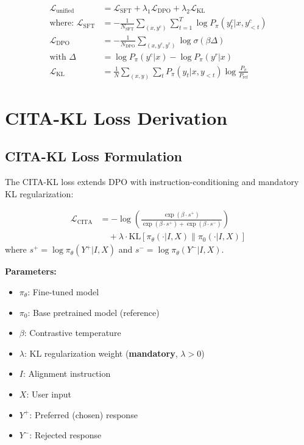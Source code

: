 \begin{align}
\mathcal{L}_{\text{unified}} &= \mathcal{L}_{\text{SFT}} + \lambda_1 \mathcal{L}_{\text{DPO}} + \lambda_2 \mathcal{L}_{\text{KL}} \nonumber \\[3pt]
\text{where: } \mathcal{L}_{\text{SFT}} &= -\frac{1}{N_{\text{SFT}}} \sum_{(x, y^{c})} \sum_{t=1}^{T} \log P_\pi(y_t^{c}|x, y_{<t}^{c}) \nonumber \\[3pt]
\mathcal{L}_{\text{DPO}} &= -\frac{1}{N_{\text{DPO}}} \sum_{(x, y^{c}, y^{r})} \log \sigma(\beta \Delta) \nonumber \\
\text{with } \Delta &= \log P_\pi(y^{c}|x) - \log P_\pi(y^{r}|x) \nonumber \\[3pt]
\mathcal{L}_{\text{KL}} &= \frac{1}{N} \sum_{(x,y)} \sum_{t} P_\pi(y_t|x, y_{<t}) \log \frac{P_\pi}{P_{\text{ref}}}
\label{eq:full_expanded}
\end{align}

\section{CITA-KL Loss Derivation}
\label{sec:appendix_cita_kl}

\subsection{CITA-KL Loss Formulation}

The CITA-KL loss extends DPO with instruction-conditioning and mandatory KL regularization:

\begin{align}
\mathcal{L}_{\text{CITA}} &= -\log\left(\frac{\exp(\beta \cdot s^+)}{\exp(\beta \cdot s^+) + \exp(\beta \cdot s^-)}\right) \nonumber \\
&\quad + \lambda \cdot \text{KL}[\pi_\theta(\cdot | I, X) \| \pi_0(\cdot | I, X)]
\label{eq:cita_kl_full}
\end{align}
where $s^+ = \log \pi_\theta(Y^+ | I, X)$ and $s^- = \log \pi_\theta(Y^- | I, X)$.

\textbf{Parameters:}
\begin{itemize}[leftmargin=*,itemsep=1pt]
    \item $\pi_\theta$: Fine-tuned model
    \item $\pi_0$: Base pretrained model (reference)
    \item $\beta$: Contrastive temperature
    \item $\lambda$: KL regularization weight (\textbf{mandatory}, $\lambda > 0$)
    \item $I$: Alignment instruction
    \item $X$: User input
    \item $Y^+$: Preferred (chosen) response
    \item $Y^-$: Rejected response
\end{itemize}

